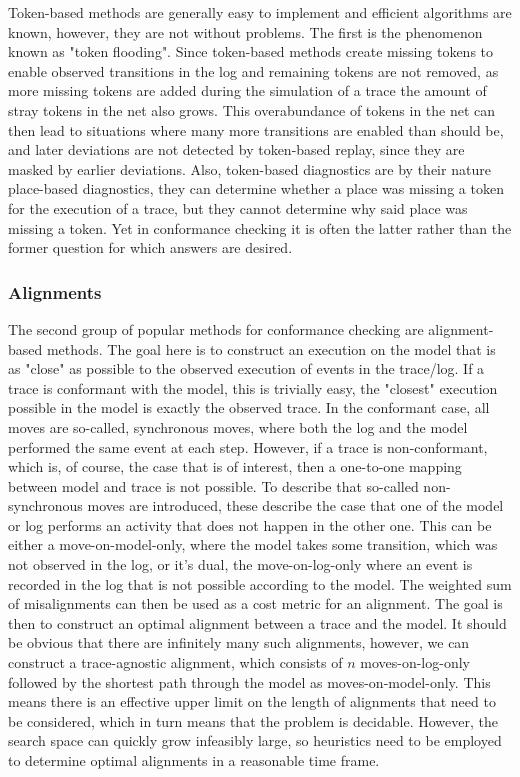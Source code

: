 \documentclass[runningheads]{template/llncs}
\begin{document}
Token-based methods are generally easy to implement and efficient algorithms are known, however, they are not without problems.
The first is the phenomenon known as "token flooding". Since token-based methods create missing tokens to enable observed transitions in the log and remaining tokens are not removed, as more missing tokens are added during the simulation of a trace the  amount of stray tokens in the net also grows.
This overabundance of tokens in the net can then lead to situations where many more transitions are enabled than should be, and later deviations are not detected by token-based replay, since they are masked by earlier deviations.
Also, token-based diagnostics are  by their nature place-based diagnostics, they can determine whether a place was missing a token for the execution of a trace, but they cannot determine why said place was missing a token. 
Yet in conformance checking it is often the latter rather than the former question for which answers are desired. 

\subsubsection{Alignments}

The second group of popular methods for conformance checking are alignment-based methods.
The goal here is to construct an execution on the model that is as "close" as possible to the observed execution of events in the trace/log.
If a trace is conformant with the model, this is trivially easy, the "closest" execution possible in the model is exactly the observed trace.
In the conformant case, all moves are so-called, synchronous moves, where both the log and the model performed the same event at each step.
However, if a trace is non-conformant, which is, of course, the case that is of interest, then a one-to-one mapping between model and trace is not possible.
To describe that so-called non-synchronous moves are introduced, these describe the case that one of  the model or log performs an activity that does not happen in the other one.
This can be either a move-on-model-only, where the model takes some transition, which was not observed in the log, or it's dual, the move-on-log-only where an event is recorded in the log that is not possible according to the model.
The weighted sum of misalignments can then be used as a cost metric for an alignment. 
The goal is then to construct an optimal alignment between a trace and the model.
It should be obvious that there are infinitely many such alignments, however, we can construct a trace-agnostic alignment, which consists of $n$ moves-on-log-only followed by the shortest path through the model as moves-on-model-only.
This means there is an effective upper limit on the length of alignments that need to be considered, which in turn means that the problem is decidable. 
However, the search space can quickly grow infeasibly large, so heuristics need to be employed to determine optimal alignments in a reasonable time frame.
\end{document}
